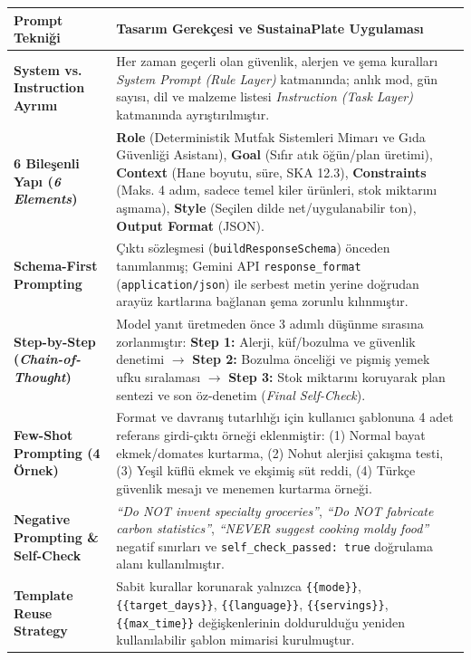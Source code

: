 \documentclass[9pt,a4paper]{article}
\begin{document}
\vspace{1pt}
{\scriptsize
\renewcommand{\arraystretch}{1.12}
\begin{tabularx}{\textwidth}{>{\bfseries\color{undpdark}}p{3.1cm} X}
\toprule
\textbf{Prompt Tekniği} & \textbf{Tasarım Gerekçesi ve SustainaPlate Uygulaması} \\
\midrule
System vs. Instruction Ayrımı & Her zaman geçerli olan güvenlik, alerjen ve şema kuralları \emph{System Prompt (Rule Layer)} katmanında; anlık mod, gün sayısı, dil ve malzeme listesi \emph{Instruction (Task Layer)} katmanında ayrıştırılmıştır. \\
6 Bileşenli Yapı (\emph{6 Elements}) & \textbf{Role} (Deterministik Mutfak Sistemleri Mimarı ve Gıda Güvenliği Asistanı), \textbf{Goal} (Sıfır atık öğün/plan üretimi), \textbf{Context} (Hane boyutu, süre, SKA 12.3), \textbf{Constraints} (Maks. 4 adım, sadece temel kiler ürünleri, stok miktarını aşmama), \textbf{Style} (Seçilen dilde net/uygulanabilir ton), \textbf{Output Format} (JSON). \\
Schema-First Prompting & Çıktı sözleşmesi (\texttt{buildResponseSchema}) önceden tanımlanmış; Gemini API \texttt{response\_format} (\texttt{application/json}) ile serbest metin yerine doğrudan arayüz kartlarına bağlanan şema zorunlu kılınmıştır. \\
Step-by-Step (\emph{Chain-of-Thought}) & Model yanıt üretmeden önce 3 adımlı düşünme sırasına zorlanmıştır: \textbf{Step 1:} Alerji, küf/bozulma ve güvenlik denetimi $\rightarrow$ \textbf{Step 2:} Bozulma önceliği ve pişmiş yemek ufku sıralaması $\rightarrow$ \textbf{Step 3:} Stok miktarını koruyarak plan sentezi ve son öz-denetim (\emph{Final Self-Check}). \\
Few-Shot Prompting (4 Örnek) & Format ve davranış tutarlılığı için kullanıcı şablonuna 4 adet referans girdi-çıktı örneği eklenmiştir: (1) Normal bayat ekmek/domates kurtarma, (2) Nohut alerjisi çakışma testi, (3) Yeşil küflü ekmek ve ekşimiş süt reddi, (4) Türkçe güvenlik mesajı ve menemen kurtarma örneği. \\
Negative Prompting \& Self-Check & \emph{``Do NOT invent specialty groceries''}, \emph{``Do NOT fabricate carbon statistics''}, \emph{``NEVER suggest cooking moldy food''} negatif sınırları ve \texttt{self\_check\_passed: true} doğrulama alanı kullanılmıştır. \\
Template Reuse Strategy & Sabit kurallar korunarak yalnızca \texttt{\{\{mode\}\}}, \texttt{\{\{target\_days\}\}}, \texttt{\{\{language\}\}}, \texttt{\{\{servings\}\}}, \texttt{\{\{max\_time\}\}} değişkenlerinin doldurulduğu yeniden kullanılabilir şablon mimarisi kurulmuştur. \\
\bottomrule
\end{tabularx}
}
\end{document}
